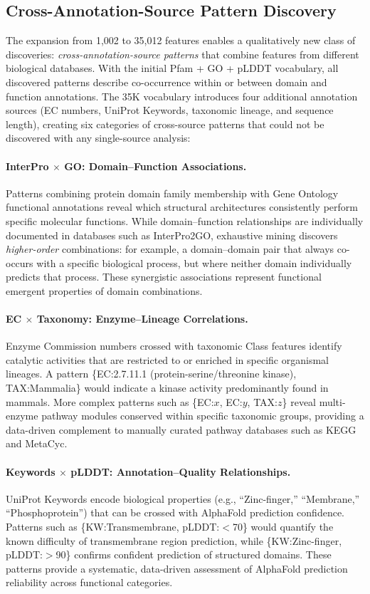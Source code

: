 \subsection{Cross-Annotation-Source Pattern Discovery}
\label{sec:cross-feature}

The expansion from 1,002 to 35,012 features enables a qualitatively new class
of discoveries: \emph{cross-annotation-source patterns} that combine features
from different biological databases. With the initial Pfam + GO + pLDDT
vocabulary, all discovered patterns describe co-occurrence within or between
domain and function annotations. The 35K vocabulary introduces four additional
annotation sources (EC numbers, UniProt Keywords, taxonomic lineage, and
sequence length), creating six categories of cross-source patterns that could
not be discovered with any single-source analysis:

\paragraph{InterPro $\times$ GO: Domain--Function Associations.}
Patterns combining protein domain family membership with Gene Ontology
functional annotations reveal which structural architectures consistently
perform specific molecular functions. While domain--function relationships are
individually documented in databases such as InterPro2GO, exhaustive mining
discovers \emph{higher-order} combinations: for example, a domain--domain pair
that always co-occurs with a specific biological process, but where neither
domain individually predicts that process. These synergistic associations
represent functional emergent properties of domain combinations.

\paragraph{EC $\times$ Taxonomy: Enzyme--Lineage Correlations.}
Enzyme Commission numbers crossed with taxonomic Class features identify
catalytic activities that are restricted to or enriched in specific organismal
lineages. A pattern \{EC:2.7.11.1 (protein-serine/threonine kinase),
TAX:Mammalia\} would indicate a kinase activity predominantly found in
mammals. More complex patterns such as \{EC:$x$, EC:$y$, TAX:$z$\} reveal
multi-enzyme pathway modules conserved within specific taxonomic groups,
providing a data-driven complement to manually curated pathway databases such
as KEGG and MetaCyc.

\paragraph{Keywords $\times$ pLDDT: Annotation--Quality Relationships.}
UniProt Keywords encode biological properties (e.g., ``Zinc-finger,''
``Membrane,'' ``Phosphoprotein'') that can be crossed with AlphaFold prediction
confidence. Patterns such as \{KW:Transmembrane, pLDDT:$<$70\} would
quantify the known difficulty of transmembrane region prediction, while
\{KW:Zinc-finger, pLDDT:$>$90\} confirms confident prediction of structured
domains. These patterns provide a systematic, data-driven assessment of
AlphaFold prediction reliability across functional categories.

